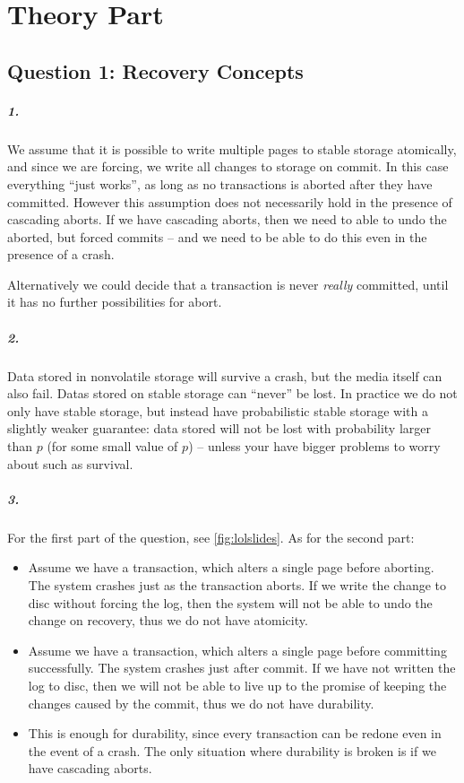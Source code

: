 \chapter{Theory Part}

\section{Question 1: Recovery Concepts}

\paragraph{1.} We assume that it is possible to write multiple pages
to stable storage atomically, and since we are forcing, we write all
changes to storage on commit. In this case everything ``just works'',
as long as no transactions is aborted after they have
committed. However this assumption does not necessarily hold in the
presence of cascading aborts. If we have cascading aborts, then we
need to able to undo the aborted, but forced commits -- and we need to
be able to do this even in the presence of a crash.

Alternatively we could decide that a transaction is never
\emph{really} committed, until it has no further possibilities for abort.

\paragraph{2.} Data stored in nonvolatile storage will survive a
crash, but the media itself can also fail. Datas stored on stable
storage can ``never'' be lost. In practice we do not only have stable
storage, but instead have probabilistic stable storage with a slightly
weaker guarantee: data stored will not be lost with probability larger
than $p$ (for some small value of $p$) -- unless your have bigger
problems to worry about such as survival.

\paragraph{3.} For the first part of the question, see
\autoref{fig:lolslides}. As for the second part:

\begin{itemize}
\item Assume we have a transaction, which alters a single page before
  aborting. The system crashes just as the transaction aborts. If we
  write the change to disc without forcing the log, then the system
  will not be able to undo the change on recovery, thus we do not have
  atomicity.
\item Assume we have a transaction, which alters a single page before
  committing successfully. The system crashes just after commit. If we
  have not written the log to disc, then we will not be able to live
  up to the promise of keeping the changes caused by the commit, thus
  we do not have durability.
\item This is enough for durability, since every transaction can be
  redone even in the event of a crash. The only situation where
  durability is broken is if we have cascading aborts.
\end{itemize}

